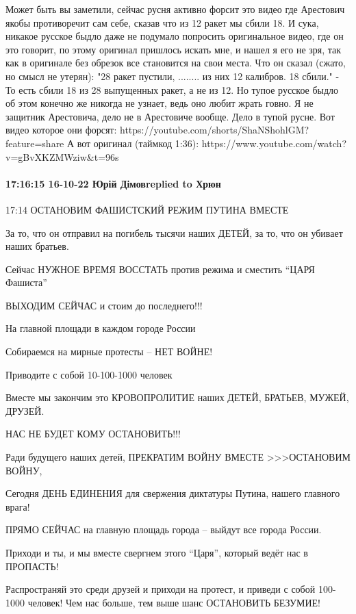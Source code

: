 Может быть вы заметили, сейчас русня активно форсит это видео где Арестович якобы противоречит сам себе, сказав что из 12 ракет мы сбили 18. И сука, никакое русское быдло даже не подумало попросить оригинальное видео, где он это говорит, по этому оригинал пришлось искать мне, и нашел я его не зря, так как в оригинале без обрезок все становится на свои места. Что он сказал (сжато, но смысл не утерян): "28 ракет пустили, ........ из них 12 калибров. 18 сбили." - То есть сбили 18 из 28 выпущенных ракет, а не из 12. Но тупое русское быдло об этом конечно же никогда не узнает, ведь оно любит жрать говно.
Я не защитник Арестовича, дело не в Арестовиче вообще. Дело в тупой русне.
Вот видео которое они форсят: https://youtube.com/shorts/ShaNShohlGM?feature=share
А вот оригинал (таймкод 1:36):
https://www.youtube.com/watch?v=gBvXKZMWziw&t=96s

\paragraph{17:16:15 16-10-22 Юрій Дімовreplied to Хрюн}

17:14
ОСТАНОВИМ ФАШИСТСКИЙ РЕЖИМ ПУТИНА ВМЕСТЕ

За то, что он отправил на погибель тысячи наших ДЕТЕЙ, за то, что он убивает наших братьев.

Сейчас НУЖНОЕ ВРЕМЯ ВОССТАТЬ против режима и сместить “ЦАРЯ Фашиста”

ВЫХОДИМ СЕЙЧАС и стоим до последнего!!!

На главной площади в каждом городе России

Собираемся на мирные протесты – НЕТ ВОЙНЕ!

Приводите с собой 10-100-1000 человек

Вместе мы закончим это КРОВОПРОЛИТИЕ наших ДЕТЕЙ, БРАТЬЕВ, МУЖЕЙ, ДРУЗЕЙ.

НАС НЕ БУДЕТ КОМУ ОСТАНОВИТЬ!!!

Ради будущего наших детей, ПРЕКРАТИМ ВОЙНУ ВМЕСТЕ >>>ОСТАНОВИМ ВОЙНУ,

Сегодня ДЕНЬ ЕДИНЕНИЯ для свержения диктатуры Путина, нашего главного врага!

ПРЯМО СЕЙЧАС на главную площадь города – выйдут все города России.

Приходи и ты, и мы вместе свергнем этого “Царя”, который ведёт нас в ПРОПАСТЬ!

Распространяй это среди друзей и приходи на протест, и приведи с собой 100-1000 человек! Чем нас больше, тем выше шанс ОСТАНОВИТЬ БЕЗУМИЕ!

